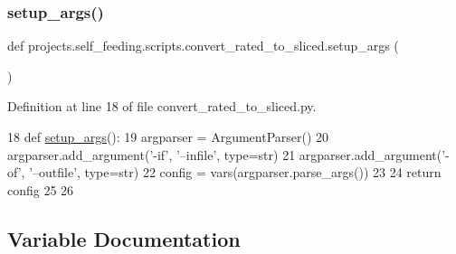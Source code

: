 \mbox{\label{namespaceprojects_1_1self__feeding_1_1scripts_1_1convert__rated__to__sliced_ae468e6330f1daa2e0ec2408e5049e097}} 
\subsubsection{\texorpdfstring{setup\+\_\+args()}{setup\_args()}}
{\footnotesize\ttfamily def projects.\+self\+\_\+feeding.\+scripts.\+convert\+\_\+rated\+\_\+to\+\_\+sliced.\+setup\+\_\+args (\begin{DoxyParamCaption}{ }\end{DoxyParamCaption})}



Definition at line 18 of file convert\+\_\+rated\+\_\+to\+\_\+sliced.\+py.


\begin{DoxyCode}
18 \textcolor{keyword}{def }\hyperlink{namespaceprojects_1_1self__feeding_1_1scripts_1_1convert__rated__to__sliced_ae468e6330f1daa2e0ec2408e5049e097}{setup\_args}():
19     argparser = ArgumentParser()
20     argparser.add\_argument(\textcolor{stringliteral}{'-if'}, \textcolor{stringliteral}{'--infile'}, type=str)
21     argparser.add\_argument(\textcolor{stringliteral}{'-of'}, \textcolor{stringliteral}{'--outfile'}, type=str)
22     config = vars(argparser.parse\_args())
23 
24     \textcolor{keywordflow}{return} config
25 
26 
\end{DoxyCode}


\subsection{Variable Documentation}
\mbox{\label{namespaceprojects_1_1self__feeding_1_1scripts_1_1convert__rated__to__sliced_ac1803c7956e2dc63a40562478498245c}} 
